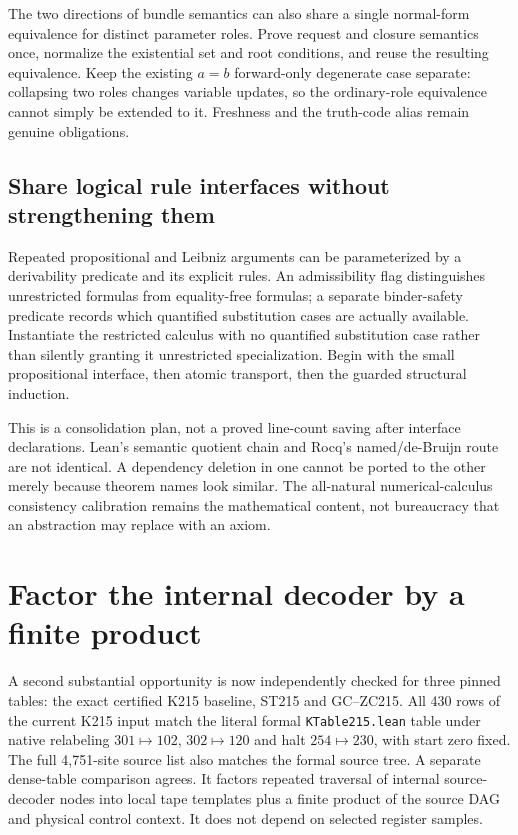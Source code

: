 \documentclass[11pt]{article}
\begin{document}
The two directions of bundle semantics can also share a single normal-form equivalence for distinct parameter roles. Prove request and closure semantics once, normalize the existential set and root conditions, and reuse the resulting equivalence. Keep the existing $a=b$ forward-only degenerate case separate: collapsing two roles changes variable updates, so the ordinary-role equivalence cannot simply be extended to it. Freshness and the truth-code alias remain genuine obligations.

\subsection{Share logical rule interfaces without strengthening them}
Repeated propositional and Leibniz arguments can be parameterized by a derivability predicate and its explicit rules. An admissibility flag distinguishes unrestricted formulas from equality-free formulas; a separate binder-safety predicate records which quantified substitution cases are actually available. Instantiate the restricted calculus with no quantified substitution case rather than silently granting it unrestricted specialization. Begin with the small propositional interface, then atomic transport, then the guarded structural induction.

This is a consolidation plan, not a proved line-count saving after interface declarations. Lean's semantic quotient chain and Rocq's named/de-Bruijn route are not identical. A dependency deletion in one cannot be ported to the other merely because theorem names look similar. The all-natural numerical-calculus consistency calibration remains the mathematical content, not bureaucracy that an abstraction may replace with an axiom.

\section{Factor the internal decoder by a finite product}
A second substantial opportunity is now independently checked for three pinned tables: the exact certified K215 baseline, ST215 and GC--ZC215. All 430 rows of the current K215 input match the literal formal \texttt{KTable215.lean} table under native relabeling $301\mapsto102$, $302\mapsto120$ and halt $254\mapsto230$, with start zero fixed. The full 4,751-site source list also matches the formal source tree. A separate dense-table comparison agrees. It factors repeated traversal of internal source-decoder nodes into local tape templates plus a finite product of the source DAG and physical control context. It does not depend on selected register samples.
\end{document}
